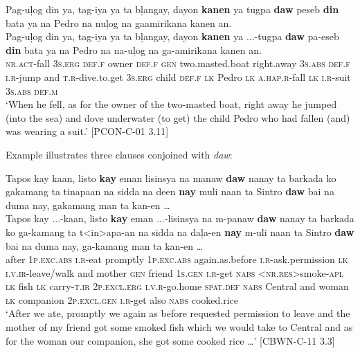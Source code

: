 \ea
\label{ex:wearingasuit}
Pag-uļog din ya, tag-iya ya ta bļangay, dayon \textbf{kanen} ya tugpa \textbf{daw} peseb \textbf{din} bata ya na Pedro na nuļog na gaamirikana kanen an. \\
\gll Pag-uļog din ya, tag-iya ya ta bļangay, dayon \textbf{kanen} ya ...-tugpa \textbf{daw} pa-eseb \textbf{din} bata ya na Pedro na na-uļog na ga-amirikana kanen an. \\
\textsc{nr.act}-fall 3\textsc{s.erg} \textsc{def.f} owner \textsc{def.f}  \textsc{gen} two.masted.boat right.away 3\textsc{s.abs} \textsc{def.f} \textsc{i.r}-jump and \textsc{t.r}-dive.to.get 3\textsc{s.erg} child \textsc{def.f} \textsc{lk} Pedro \textsc{lk} \textsc{a.hap.r}-fall \textsc{lk} \textsc{i.r}-suit 3\textsc{s.abs} \textsc{def.m} \\
\glt ‘When he fell, as for the owner of the two-masted boat, right away he jumped (into the sea) and dove underwater (to get) the child Pedro who had fallen (and) was wearing a suit.’ [PCON-C-01 3.11]
\z

Example  illustrates three clauses conjoined with \textit{daw}:

\ea
\label{ex:gotsomecookedrice}
Tapos kay kaan, listo \textbf{kay} eman lisinsya na manaw \textbf{daw} nanay ta barkada ko gakamang ta tinapaan na sidda na deen \textbf{nay} muli naan ta Sintro \textbf{daw} bai na duma nay, gakamang man ta kan-en …\\\smallskip
\gll Tapos kay ...-kaan, listo \textbf{kay} eman ...-lisinsya na m-panaw \textbf{daw} nanay ta barkada ko ga-kamang ta t<in>apa-an na sidda na daļa-en \textbf{nay} m-uli naan ta Sintro \textbf{daw} bai na duma nay, ga-kamang man ta kan-en … \\
after 1\textsc{p.exc.abs} \textsc{i.r}-eat promptly  1\textsc{p.exc.abs} again.as.before \textsc{i.r}-ask.permission \textsc{lk} \textsc{i.v.ir}-leave/walk and mother \textsc{gen} friend 1\textsc{s.gen} \textsc{i.r}-get \textsc{nabs} <\textsc{nr.res}>smoke-\textsc{apl} \textsc{lk} fish \textsc{lk} carry-\textsc{t.ir} 2\textsc{p.excl.erg} \textsc{i.v.r}-go.home \textsc{spat.def} \textsc{nabs} Central  and woman \textsc{lk} companion 2\textsc{p.excl.gen} \textsc{i.r}-get also \textsc{nabs} cooked.rice \\
\glt ‘After we ate, promptly we again as before requested permission to leave  and the mother of my friend got some smoked fish which we would take to Central and as for the woman our companion, she got some cooked rice …’ [CBWN-C-11 3.3]
\z

